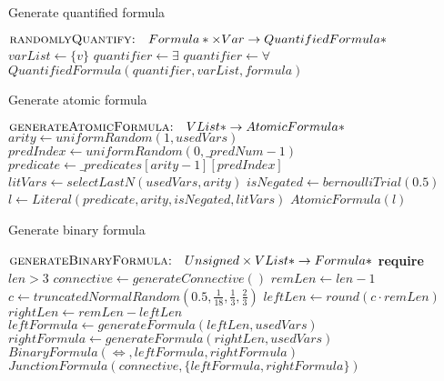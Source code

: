 \begin{algorithm}[H]
  \caption{Generate quantified formula}\label{alg:generate-quantified-formula}
  \begin{algorithmic}[1]
      \Statex{}  \(\textsc{randomlyQuantify:} \quad Formula* \times Var \to QuantifiedFormula*\)
        \State{} \(varList \gets \{v\}\)
          \State{} \(quantifier \gets \exists\)
        \Else{}
          \State{} \(quantifier \gets \forall\)
        \EndIf{}
        \State{} \Return{} \(QuantifiedFormula(quantifier,varList, formula)\)
      \EndFunction{}
  \end{algorithmic}

\end{algorithm}
\begin{algorithm}[H]
  \caption{Generate atomic formula}\label{alg:generate-atomic-formula}
  \begin{algorithmic}[1]
      \Statex{}  \(\textsc{generateAtomicFormula:} \quad VList* \to AtomicFormula*\)
        \State{} \(arity \gets uniformRandom(1,usedVars)\)
        \State{} \(predIndex \gets uniformRandom(0, \_predNum - 1)\)
        \State{} \(predicate \gets \_predicates[arity-1] [predIndex]\)
        \State{} \(litVars \gets selectLastN(usedVars, arity)\)
        \State{} \(isNegated \gets bernoulliTrial(0.5)\)
        \State{} \(l \gets Literal(predicate, arity, isNegated,litVars)\)
        \State{} \Return{} \(AtomicFormula(l)\)
      \EndFunction{}
  \end{algorithmic}
\end{algorithm}
\begin{algorithm}[H]
  \caption{Generate binary formula}\label{alg:generate-binary-formula}
  \begin{algorithmic}[1]
      \Statex{}  \(\textsc{generateBinaryFormula:} \quad Unsigned \times VList* \to Formula*\)
      \Statex{} \textbf{require} \(len > 3\)
        \State{} \(connective \gets generateConnective()\)
        \State{} \(remLen \gets len - 1\)
        \State{} \(c \gets truncatedNormalRandom(0.5, \frac{1}{18}, \frac{1}{3}, \frac{2}{3})\)
        \State{} \(leftLen \gets round(c \cdot remLen)\)
        \State{} \(rightLen \gets remLen - leftLen\)
        \State{} \(leftFormula \gets generateFormula(leftLen, usedVars)\)
        \State{} \(rightFormula \gets generateFormula(rightLen, usedVars)\)
          \State{} \Return{} \(BinaryFormula(\iff,leftFormula, rightFormula)\)
        \Else{}
          \State{} \Return{} \(JunctionFormula(connective,\{leftFormula, rightFormula\})\)
        \EndIf{}
      \EndFunction{}
  \end{algorithmic}
\end{algorithm}


